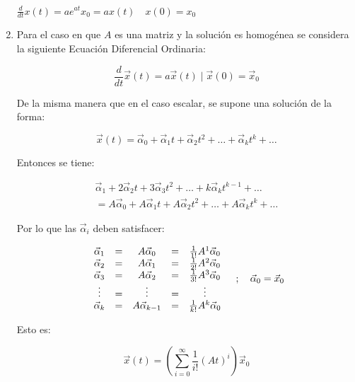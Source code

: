 \documentclass[12pt]{article}
\numberwithin{equation}{subsection}
\begin{document}
\begin{enumerate}
\begin{math}
\frac{d}{dt} x(t) = a e^{at} x_0 = a x(t) \quad x(0) = x_0
\end{math}

\item
Para el caso en que $A$ es una matriz y la solución es homogénea se considera la siguiente Ecuación Diferencial Ordinaria:

\begin{equation}
\frac{d}{dt} \vec{x}(t) = a \vec{x}(t) \mid \vec{x}(0) = \vec{x}_0
\end{equation}

De la misma manera que en el caso escalar, se supone una solución de la forma:

\begin{equation}
\vec{x}(t) = \vec{\alpha}_0 + \vec{\alpha}_1 t + \vec{\alpha}_2 t^2 + \dots + \vec{\alpha}_k t^k + \dots
\end{equation}

Entonces se tiene:

\begin{multline}
\vec{\alpha}_1 + 2 \vec{\alpha}_2 t + 3 \vec{\alpha}_3 t^2 + \dots + k \vec{\alpha}_k t^{k-1} + \dots \\ = A \vec{\alpha}_0 + A \vec{\alpha}_1 t + A \vec{\alpha}_2 t^2 + \dots + A \vec{\alpha}_k t^k + \dots \nonumber
\end{multline}

Por lo que las $\vec{\alpha}_i$ deben satisfacer:

\begin{equation}
\begin{array}{c c c c c}
\vec{\alpha}_1 & = & A \vec{\alpha}_0     & = & \frac{1}{1!} A^1 \vec{\alpha}_0 \\
\vec{\alpha}_2 & = & A \vec{\alpha}_1     & = & \frac{1}{2!} A^2 \vec{\alpha}_0 \\
\vec{\alpha}_3 & = & A \vec{\alpha}_2     & = & \frac{1}{3!} A^3 \vec{\alpha}_0 \\
\vdots   & = & \vdots         & = & \vdots                    \\
\vec{\alpha}_k & = & A \vec{\alpha}_{k-1} & = & \frac{1}{k!} A^k \vec{\alpha}_0 \\
\end{array} \quad ; \quad \vec{\alpha}_0 = \vec{x}_0
\end{equation}

Esto es:

\begin{equation}
\vec{x}(t) = \left( \sum\limits_{i = 0}^{\infty} \frac{1}{i!} (A t)^i \right) \vec{x}_0 \nonumber
\end{equation}


\end{enumerate}
\end{document}

